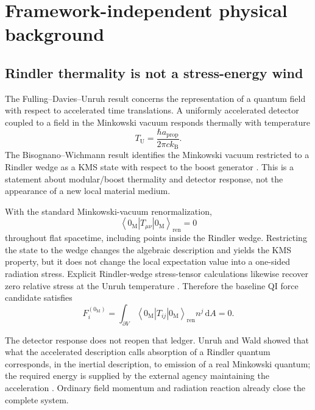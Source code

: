 \documentclass[11pt]{article}
\newcommand{\dd}{\mathrm{d}}
\newcommand{\avg}[1]{\left\langle #1\right\rangle}
\begin{document}
\section{Framework-independent physical background}
\label{sec:background}

\subsection{Rindler thermality is not a stress-energy wind}

The Fulling--Davies--Unruh result concerns the representation of a quantum field with respect to accelerated time translations. A uniformly accelerated detector coupled to a field in the Minkowski vacuum responds thermally with temperature
\begin{equation}
    T_{\mathrm U}=\frac{\hbar a_{\mathrm{prop}}}{2\pi c k_{\mathrm B}}.
    \label{eq:unruh_temp}
\end{equation}
The Bisognano--Wichmann result identifies the Minkowski vacuum restricted to a Rindler wedge as a KMS state with respect to the boost generator \cite{BisognanoWichmann1975,Crispino2008}. This is a statement about modular/boost thermality and detector response, not the appearance of a new local material medium.

With the standard Minkowski-vacuum renormalization,
\begin{equation}
    \avg{0_{\mathrm M}|T_{\mu\nu}|0_{\mathrm M}}_{\mathrm{ren}}=0
    \label{eq:minkowski_stress_zero}
\end{equation}
throughout flat spacetime, including points inside the Rindler wedge. Restricting the state to the wedge changes the algebraic description and yields the KMS property, but it does not change the local expectation value into a one-sided radiation stress. Explicit Rindler-wedge stress-tensor calculations likewise recover zero relative stress at the Unruh temperature \cite{MorettiVanzo1996}. Therefore the baseline QI force candidate satisfies
\begin{equation}
    F^{(0_{\mathrm M})}_{i}
    =\int_{\partial V}
    \avg{0_{\mathrm M}|T_{ij}|0_{\mathrm M}}_{\mathrm{ren}}
    n^{j}\,\dd A
    =0.
    \label{eq:rindler_baseline_force_zero}
\end{equation}

The detector response does not reopen that ledger. Unruh and Wald showed that what the accelerated description calls absorption of a Rindler quantum corresponds, in the inertial description, to emission of a real Minkowski quantum; the required energy is supplied by the external agency maintaining the acceleration \cite{UnruhWald1984}. Ordinary field momentum and radiation reaction already close the complete system.
\end{document}
